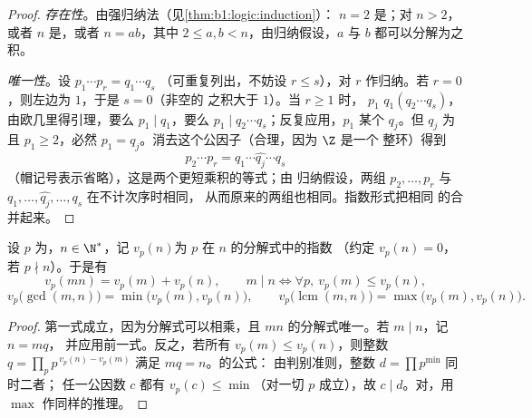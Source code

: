\begin{proof}
\emph{存在性}。由强归纳法（见\cref{thm:b1:logic:induction}）：
$n = 2$ 是；对 $n > 2$，或者 $n$ 是，或者 $n = ab$，其中
$2 \leq a, b < n$，由归纳假设，$a$ 与 $b$ 都可以分解为之积。

\emph{唯一性}。设 $p_1 \cdots p_r = q_1 \cdots q_s$
（可重复列出，不妨设 $r \leq s$），对
$r$ 作归纳。若 $r = 0$，则左边为 $1$，于是 $s = 0$（非空的
之积大于 $1$）。当 $r \geq 1$ 时， $p_1$
 $q_1(q_2\cdots q_s)$，由欧几里得引理，要么 $p_1
\mid q_1$，要么 $p_1 \mid q_2\cdots q_s$；反复应用，$p_1$ 
某个 $q_j$。但 $q_j$ 为且 $p_1 \geq 2$，必然 $p_1
= q_j$。消去这个公因子（合理，因为 $\Z$ 是一个
整环）得到
\[
p_2 \cdots p_r = q_1 \cdots \widehat{q_j} \cdots q_s
\]
（帽记号表示省略），这是两个更短乘积的等式；由
归纳假设，两组 $p_2, \dots, p_r$ 与
$q_1, \dots, \widehat{q_j}, \dots, q_s$ 在不计次序时相同，
从而原来的两组也相同。指数形式把相同
的合并起来。
\end{proof}

\begin{proposition}[赋值]\label{prop:b1:arith:valuation}
设 $p$ 为，$n \in \N^*$，记 $v_p(n)$为 $p$ 在 $n$ 的分解式中的指数
（约定 $v_p(n) = 0$，若 $p \nmid n$）。于是有
\[
v_p(mn) = v_p(m) + v_p(n),
\qquad
m \mid n \iff \forall p,\ v_p(m) \leq v_p(n),
\]
\[
v_p\bigl(\gcd(m,n)\bigr) = \min\bigl(v_p(m), v_p(n)\bigr),
\qquad
v_p\bigl(\operatorname{lcm}(m,n)\bigr) = \max\bigl(v_p(m),
v_p(n)\bigr).
\]
\end{proposition}

\begin{proof}
第一式成立，因为分解式可以相乘，且
$mn$ 的分解式唯一。若 $m \mid n$，记 $n = mq$，
并应用前一式。反之，若所有 $v_p(m) \leq v_p(n)$，则整数 $q =
\prod_p p^{\,v_p(n) - v_p(m)}$ 满足 $mq = n$。的公式：
由判别准则，整数 $d = \prod p^{\min}$ 同时二者；
任一公因数 $c$ 都有 $v_p(c) \leq \min$（对一切 $p$ 成立），故 $c
\mid d$。对，用 $\max$ 作同样的推理。
\end{proof}

